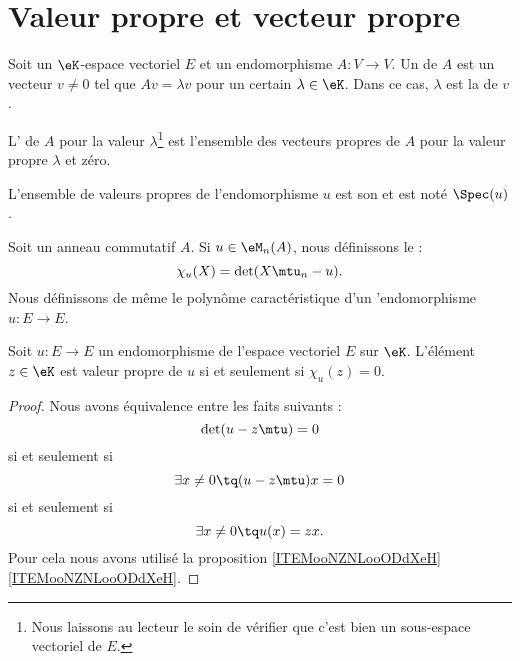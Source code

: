 \section{Valeur propre et vecteur propre}

\begin{definition}      \label{DefooMMKZooVcskCc}
    Soit un \( \eK\)-espace vectoriel \( E\) et un endomorphisme \( A\colon V\to V\). Un  de \( A\) est un vecteur \( v \neq 0\) tel que \( Av=\lambda v\) pour un certain \( \lambda\in \eK\). Dans ce cas, \( \lambda\) est la  de \( v\).

    L' de \( A\) pour la valeur \( \lambda\)\footnote{Nous laissons au lecteur le soin de vérifier que c'est bien un sous-espace vectoriel de \( E\).} est l'ensemble des vecteurs propres de \( A\) pour la valeur propre \( \lambda\) et zéro.
\end{definition}
L'ensemble de valeurs propres de l'endomorphisme \( u\) est son  et est noté \( \Spec(u)\).

\begin{definition}  \label{DefOWQooXbybYD}
    Soit un anneau commutatif \( A\). Si \( u\in\eM_n(A)\), nous définissons le  :
    \begin{equation}    \label{Eqkxbdfu}
        \chi_u(X)=\det(X\mtu_n-u).
    \end{equation} 
    Nous définissons de même le polynôme caractéristique d'un 'endomorphisme \( u\colon E\to E\).
\end{definition}

\begin{proposition}
    Soit \( u\colon E\to E\) un endomorphisme de l'espace vectoriel \( E\) sur \( \eK\). L'élément \( z\in \eK\) est valeur propre de \( u\) si et seulement si \( \chi_u(z)=0\).
\end{proposition}

\begin{proof}
    Nous avons équivalence entre les faits suivants :
    \begin{equation}
        \det(u-z\mtu)=0
    \end{equation}
    si et seulement si
    \begin{equation}
        \exists x\neq 0\tq (u-z\mtu)x=0
    \end{equation}
    si et seulement si
    \begin{equation}
        \exists x\neq 0\tq u(x)=zx.
    \end{equation}
    Pour cela nous avons utilisé la proposition \ref{ITEMooNZNLooODdXeH}\ref{ITEMooNZNLooODdXeH}.
\end{proof}

